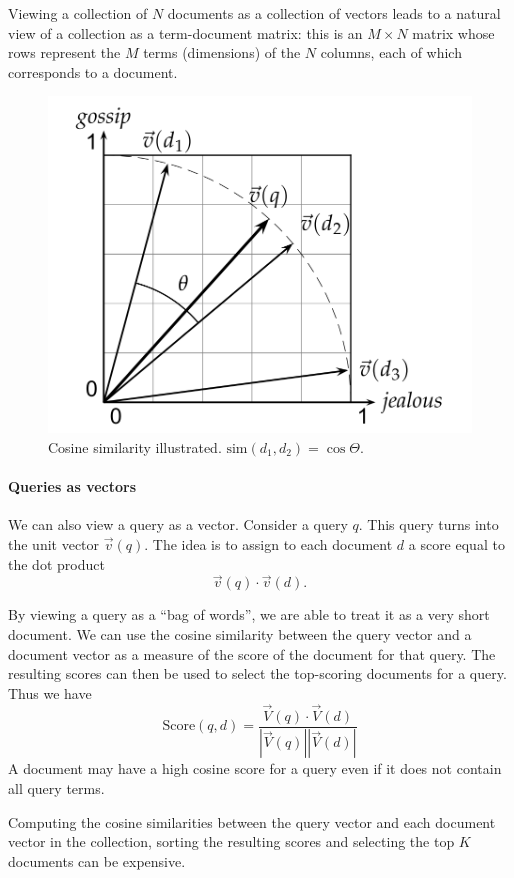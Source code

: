 \documentclass[letterpaper,11pt]{article}
\begin{document}
Viewing a collection of $N$ documents as a collection of vectors leads to a natural view of a collection as a term-document matrix: this is an $M \times N$ matrix whose rows represent the $M$ terms (dimensions) of the $N$ columns, each of which corresponds to a document.
\begin{figure}[H]
    \centering
    \includegraphics[scale=0.40]{sect6/figure_6_10.png}
    \caption{Cosine similarity illustrated. $\textrm{sim}(d_1,d_2)=\cos{\Theta}$.}
\end{figure}

\paragraph{Queries as vectors}
We can also view a query as a vector. Consider a query $q$. This query turns into the unit vector $\vec{v}(q)$. The idea is to assign to each document $d$ a score equal to the dot product
\[
\vec{v}(q) \cdot \vec{v}(d).
\]

By viewing a query as a “bag of words”, we are able to treat it as a very short document. We can use the cosine similarity between the query vector and a document vector as a measure of the score of the document for that query. The resulting scores can then be used to select the top-scoring documents for a query. Thus we have
\[
\textrm{Score}(q,d)=\frac{\vec{V}(q) \cdot \vec{V}(d)}{|\vec{V}(q)||\vec{V}(d)|}
\]
A document may have a high cosine score for a query even if it does not contain all query terms.

Computing the cosine similarities between the query vector and each document vector in the collection, sorting the resulting scores and selecting the top $K$ documents can be expensive.
\end{document}
